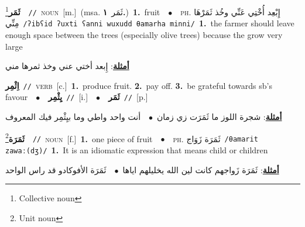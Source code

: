 \documentclass[10pt,a4paper,twoside]{article} %
\begin{document}
\begin{multicols}{2}
{{{{{{{{{{{\setlength\topsep{0pt}\textbf{\foreignlanguage{arabic}{ثَمَر}}\footnote{Collective noun}\ \ {\color{gray}\texttt{//}\color{black}}\ \textsc{noun}\ [m.]\ \color{gray}(msa. \foreignlanguage{arabic}{ثَمَر}~\foreignlanguage{arabic}{\textbf{١.}})\color{black}\ \textbf{1.}~fruit\ \ $\bullet$\ \ \textsc{ph.} \color{gray} \foreignlanguage{arabic}{إِبْعِد أُخْتِي عَنِّي وخُذ ثَمَرْهَا مِنِّي}\color{black}\ {\color{gray}\texttt{/{\sffamily ʔibʕid ʔuxti ʕanni wuxudd θamarha minni}/}\color{black}}\ \textbf{1.}~the farmer should leave enough space between the trees (especially olive trees) because the grow very large\  \begin{flushright}\color{gray}\foreignlanguage{arabic}{\textbf{\underline{\foreignlanguage{arabic}{أمثلة}}}: إِبعد أختي عني وخذ ثمرها مني}\end{flushright}\color{black}} \vspace{2mm}

{\setlength\topsep{0pt}\textbf{\foreignlanguage{arabic}{اِثْمِر}}\ {\color{gray}\texttt{//}\color{black}}\ \textsc{verb}\ [c.]\ \textbf{1.}~produce fruit.  \textbf{2.}~pay off.  \textbf{3.}~be grateful towards sb's favour\ \ $\bullet$\ \ \setlength\topsep{0pt}\textbf{\foreignlanguage{arabic}{يِثْمِر}}\ {\color{gray}\texttt{//}\color{black}}\ [i.]\ \ $\bullet$\ \ \setlength\topsep{0pt}\textbf{\foreignlanguage{arabic}{ثَمَر}}\ {\color{gray}\texttt{//}\color{black}}\ [p.]\  \begin{flushright}\color{gray}\foreignlanguage{arabic}{\textbf{\underline{\foreignlanguage{arabic}{أمثلة}}}: شجرة اللوز ما ثَمَرَت زي زمان\ $\bullet$\ \  أنت واحد واطي وما بيِثْمِر فيك المعروف}\end{flushright}\color{black}} \vspace{2mm}

{\setlength\topsep{0pt}\textbf{\foreignlanguage{arabic}{ثَمَرَة}}\footnote{Unit noun}\ \ {\color{gray}\texttt{//}\color{black}}\ \textsc{noun}\ [f.]\ \textbf{1.}~one piece of fruit\ \ $\bullet$\ \ \textsc{ph.} \color{gray} \foreignlanguage{arabic}{ثَمَرَة زَوَاج}\color{black}\ {\color{gray}\texttt{/{\sffamily θamarit zawaː(dʒ)}/}\color{black}}\ \textbf{1.}~It is an idiomatic expression that means child or children\  \begin{flushright}\color{gray}\foreignlanguage{arabic}{\textbf{\underline{\foreignlanguage{arabic}{أمثلة}}}: ثَمَرَة زَواجهم كانت لين الله يخليلهم اياها\ $\bullet$\ \  ثَمَرَة الأفوكادو قد راس الواحد}\end{flushright}\color{black}} \vspace{2mm}

}}}}}}}}}}
\end{multicols}
\end{document}
